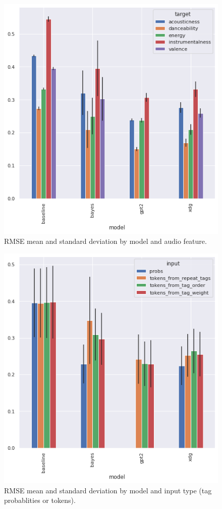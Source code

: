 \documentclass[sn-mathphys]{sn-jnl}%
\theoremstyle{thmstyleone}%
\theoremstyle{thmstyletwo}%
\theoremstyle{thmstylethree}%
\begin{document}
\begin{figure}[h!]
      \centering
      \includegraphics{images/rmse_by_model_and_feature.png}
      \caption{RMSE mean and standard deviation by model and audio feature.}
      \label{fig:rmse_by_model_and_feature}
\end{figure}


\begin{figure}[h!]
      \centering
      \includegraphics{images/rmse_by_model_and_input.png}
      \caption{RMSE mean and standard deviation by model and input type (tag probablities or tokens).}
      \label{fig:rmse_by_model_and_input}
\end{figure}
\end{document}
